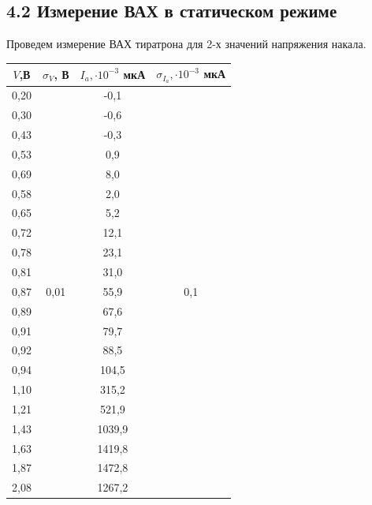 \documentclass[a4paper,12pt]{report}
\begin{document}
\subsection*{4.2 Измерение ВАХ в статическом режиме}
Проведем измерение ВАХ тиратрона для 2-х значений напряжения накала.

\begin{table}[H]
\begin{tabular}{|c|c|c|c|}
\hline
$V$,В  & $\sigma_V$, В              & $I_a, \cdot 10^{-3}$ мкА  & $\sigma_{I_{a}},\cdot10^{-3}$ мкА           \\ \hline
0,20 & \multirow{21}{*}{0,01} & -0,1   & \multirow{21}{*}{0,1} \\ \cline{1-1} \cline{3-3}
0,30 &                        & -0,6   &                       \\ \cline{1-1} \cline{3-3}
0,43 &                        & -0,3   &                       \\ \cline{1-1} \cline{3-3}
0,53 &                        & 0,9    &                       \\ \cline{1-1} \cline{3-3}
0,69 &                        & 8,0    &                       \\ \cline{1-1} \cline{3-3}
0,58 &                        & 2,0    &                       \\ \cline{1-1} \cline{3-3}
0,65 &                        & 5,2    &                       \\ \cline{1-1} \cline{3-3}
0,72 &                        & 12,1   &                       \\ \cline{1-1} \cline{3-3}
0,78 &                        & 23,1   &                       \\ \cline{1-1} \cline{3-3}
0,81 &                        & 31,0   &                       \\ \cline{1-1} \cline{3-3}
0,87 &                        & 55,9   &                       \\ \cline{1-1} \cline{3-3}
0,89 &                        & 67,6   &                       \\ \cline{1-1} \cline{3-3}
0,91 &                        & 79,7   &                       \\ \cline{1-1} \cline{3-3}
0,92 &                        & 88,5   &                       \\ \cline{1-1} \cline{3-3}
0,94 &                        & 104,5  &                       \\ \cline{1-1} \cline{3-3}
1,10 &                        & 315,2  &                       \\ \cline{1-1} \cline{3-3}
1,21 &                        & 521,9  &                       \\ \cline{1-1} \cline{3-3}
1,43 &                        & 1039,9 &                       \\ \cline{1-1} \cline{3-3}
1,63 &                        & 1419,8 &                       \\ \cline{1-1} \cline{3-3}
1,87 &                        & 1472,8 &                       \\ \cline{1-1} \cline{3-3}
2,08 &                        & 1267,2 &                       \\ \hline


\end{tabular}
\end{table}
\end{document}
